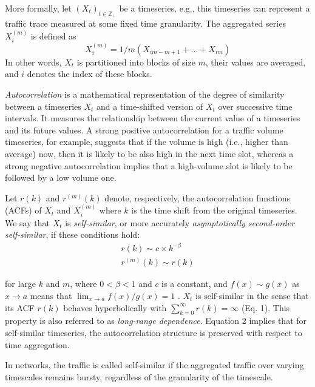 More formally, let $(X_t)_{t\in \mathbb{Z_+}}$ be a timeseries, e.g., this timeseries can represent a traffic trace measured at some fixed time granularity. The aggregated series $X^{(m)}_i$ is defined as 
\[X^{(m)}_i=1/m(X_{im-m+1}+...+X_{im})\]
In other words, $X_t$ is partitioned into blocks of size $m$, their values are averaged, and $i$ denotes the index of these blocks. 
%

\emph{Autocorrelation} is a mathematical representation of the degree of similarity between a timeseries $X_t$ and a time-shifted version of $X_t$ over successive time intervals. It measures the relationship between the current value of a timeseries and its future values.
A strong positive autocorrelation for a traffic volume timeseries, for example, suggests that if the volume is high (i.e., higher than average) now, then it is likely to be also high in the next time slot, whereas a strong negative autocorrelation implies that a high-volume slot is likely to be followed by a low volume one.

Let $r(k)$ and $r^{(m)}(k)$ denote, respectively, the autocorrelation functions (ACFs) of $X_t$ and $X^{(m)}_i$ where $k$ is the time shift from the original timeseries. We say that $X_t$ is \emph{self-similar}, or more accurately \emph{asymptotically second-order self-similar}, if these conditions hold: 
\begin{align}
r(k) \sim c \times k^{-\beta}\\
r^{(m)}(k) \sim r(k)
\end{align}

\noindent for large $k$ and $m$, where $0<\beta<1$ and $c$ is a constant, and $f(x)\sim g(x)$ as $x\to a$ means that $\lim_{x\to a} f(x)/g(x)=1$ \cite{mts_cc}. $X_t$ is self-similar in the sense that its ACF $r(k)$ behaves hyperbolically with $\sum^\infty_{k=0}r(k)=\infty$ (Eq. 1). This property is also referred to as \emph{long-range dependence}. Equation 2 implies that for self-similar timeseries, the autocorrelation structure is preserved with respect to time aggregation.

In networks, the traffic is called self-similar if the aggregated traffic over varying timescales remains bursty, regardless of the granularity of the timescale.

